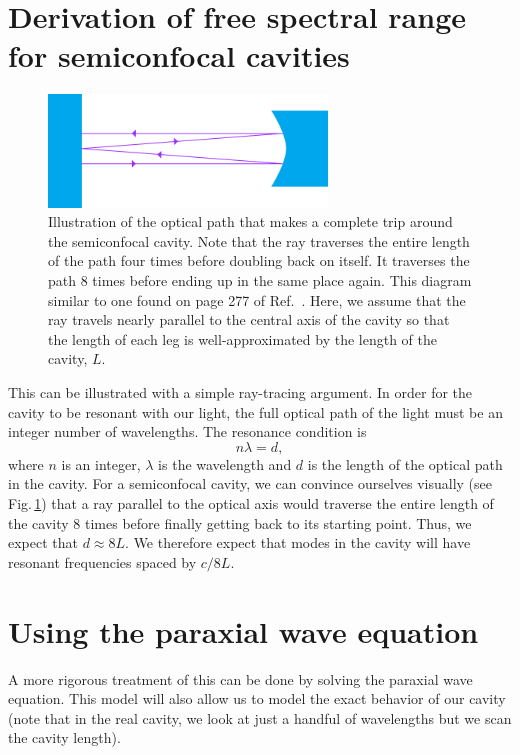 \section{Derivation of free spectral range for semiconfocal cavities}
\begin{figure}
\centerline{\includegraphics[height=3cm]{spectrum_analyzer_path.png}}
\caption[Spectrum analyzer ray path illustration]{\label{completePath}Illustration of the optical path that makes a complete trip around the semiconfocal cavity. Note that the ray traverses the entire length of the path four times before doubling back on itself. It traverses the path 8 times before ending up in the same place again. This diagram similar to one found on page 277 of Ref.\ \cite{lasersMilonniEberly}. Here, we assume that the ray travels nearly parallel to the central axis of the cavity so that the length of each leg is well-approximated by the length of the cavity, $L$.}
\end{figure}

This can be illustrated with a simple ray-tracing argument. 
In order for the cavity to be resonant with our light, the full optical path of the light must be an integer number of wavelengths. The resonance condition is 
\begin{equation}
n \lambda = d,
\end{equation}
where $n$ is an integer, $\lambda$ is the wavelength and $d$ is the length of the optical path in the cavity. 
For a semiconfocal cavity, we can convince ourselves visually (see Fig.\,\ref{completePath}) that a ray parallel to the optical axis would traverse the entire length of the cavity 8 times before finally getting back to its starting point. Thus, we expect that $d\approx 8L$.
We therefore expect that modes in the cavity will have resonant frequencies spaced by $c/8L$. 

\section{Using the paraxial wave equation}

A more rigorous treatment of this can be done by solving the paraxial wave equation. This model will also allow us to model the exact behavior of our cavity (note that in the real cavity, we look at just a handful of wavelengths but we scan the cavity length).

